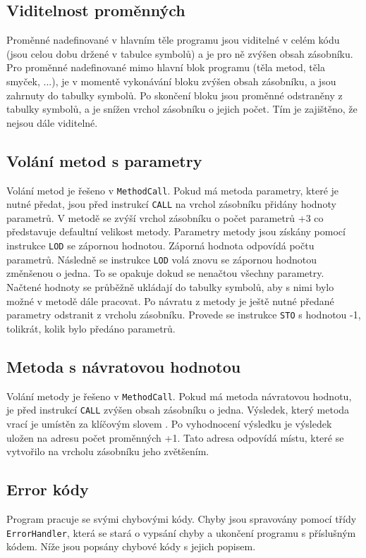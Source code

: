 \documentclass[12pt, a4paper]{article}
\begin{document}
\subsection{Viditelnost proměnných}
\noindent Proměnné nadefinované v hlavním těle programu jsou viditelné v celém kódu (jsou celou dobu držené v tabulce symbolů) a je pro ně zvýšen obsah zásobníku. Pro proměnné nadefinované mimo hlavní blok programu (těla metod, těla smyček, ...), je v momentě vykonávání bloku zvýšen obsah zásobníku, a jsou zahrnuty do tabulky symbolů. Po skončení bloku jsou proměnné odstraněny z tabulky symbolů, a je snížen vrchol zásobníku o jejich počet. Tím je zajištěno, že nejsou dále viditelné.

\subsection{Volání metod s parametry}
\noindent Volání metod je řešeno v \texttt{MethodCall}. Pokud má metoda parametry, které je nutné předat, jsou před instrukcí \texttt{CALL} na vrchol zásobníku přidány hodnoty parametrů. V metodě se zvýší vrchol zásobníku o počet parametrů +3 co představuje defaultní velikost metody. Parametry metody jsou získány pomocí instrukce \texttt{LOD} se zápornou hodnotou. Záporná hodnota odpovídá počtu parametrů. Následně se instrukce \texttt{LOD} volá znovu se zápornou hodnotou změnšenou o jedna. To se opakuje dokud se nenačtou všechny parametry. Načtené hodnoty se průběžně ukládají do tabulky symbolů, aby s nimi bylo možné v metodě dále pracovat. Po návratu z metody je ještě nutné předané parametry odstranit z vrcholu zásobníku. Provede se instrukce \texttt{STO} s hodnotou -1, tolikrát, kolik bylo předáno parametrů.

\subsection{Metoda s návratovou hodnotou}
\noindent Volání metody je řešeno v \texttt{MethodCall}. Pokud má metoda návratovou hodnotu, je před instrukcí \texttt{CALL} zvýšen obsah zásobníku o jedna. Výsledek, který metoda vrací je umístěn za klíčovým slovem . Po vyhodnocení výsledku je výsledek uložen na adresu počet proměnných +1. Tato adresa odpovídá místu, které se vytvořilo na vrcholu zásobníku jeho zvětšením.
\subsection{Error kódy}
\noindent Program pracuje se svými chybovými kódy. Chyby jsou spravovány pomocí třídy \texttt{ErrorHandler}, která se stará o vypsání chyby a ukončení programu s příslušným kódem. Níže jsou popsány chybové kódy s jejich popisem.
\end{document}
